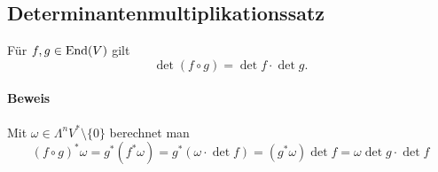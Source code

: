 \subsection{Determinantenmultiplikationssatz}
	\begin{Satz}[Determinantenmultiplikationssatz]
		Für $ f,g\in \operatorname{End}(V) $ gilt
			\[ \det(f\circ g) = \det f \cdot \det g. \]
	\end{Satz}
\paragraph{Beweis}
	Mit $ \omega\in\Lambda^nV^*\setminus\{0\} $ berechnet man
		\[ (f\circ g)^*\omega = g^*(f^*\omega) = g^*(\omega\cdot \det f) = (g^*\omega)\det f = \omega \det g\cdot \det f \]